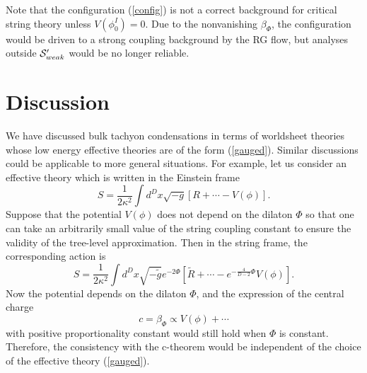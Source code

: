 \documentclass[a4paper,a4paper]{article}
\begin{document}
Note that the configuration (\ref{config}) is not a correct background for critical string theory unless 
$V(\phi^I_0)=0$. 
Due to the nonvanishing $\beta_\Phi$, the configuration would be driven to a strong coupling background by the RG 
flow, but analyses outside ${\cal S}'_{weak}$ would be no longer reliable. 























\vspace{1cm}

\section{Discussion}   \label{discussion}

\vspace{5mm}

We have discussed bulk tachyon condensations in terms of worldsheet theories whose low energy effective theories 
are of the form (\ref{gauged}). 
Similar discussions could be applicable to more general situations. 
For example, let us consider an effective theory which is written in the Einstein frame 
\begin{equation}
S = \frac1{2\kappa^2}\int d^Dx\sqrt{-g}\left[R+\cdots-V(\phi)\right].
\end{equation}
Suppose that the potential $V(\phi)$ does not depend on the dilaton $\Phi$ so that one can take an arbitrarily 
small value of the string coupling constant to ensure the validity of the tree-level approximation. 
Then in the string frame, the corresponding action is
\begin{equation}
S = \frac1{2\kappa^2}\int d^Dx\sqrt{-\tilde{g}}e^{-2\Phi}\left[\tilde{R}+\cdots-e^{-\frac4{D-2}\Phi}V(\phi)\right]. 
\end{equation}
Now the potential depends on the dilaton $\Phi$, and the expression of the central charge 
\begin{equation}
c=\beta_\Phi \propto V(\phi)+\cdots
\end{equation}
with positive proportionality constant would still hold when $\Phi$ is constant. 
Therefore, the consistency with the c-theorem would be independent of the choice of the effective theory 
(\ref{gauged}). 
\end{document}
